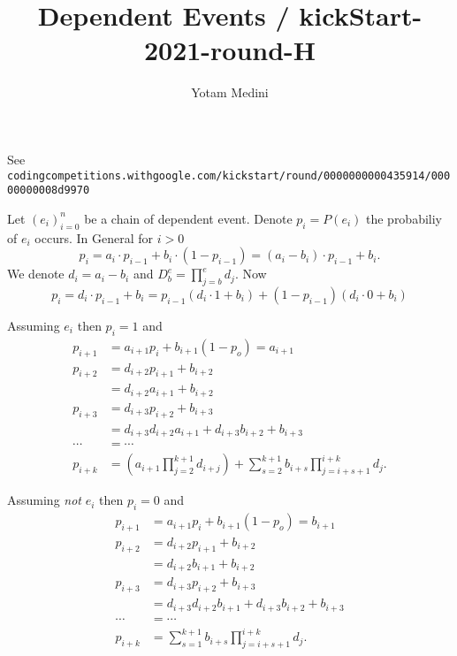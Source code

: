 \documentclass[10pt]{article}
\title{Dependent Events / kickStart-2021-round-H}
\author{Yotam Medini}
\begin{document}
\maketitle

See \texttt{codingcompetitions.withgoogle.com/kickstart/round/0000000000435914/00000000008d9970}

Let \((e_i)_{i=0}^n\) be a chain of dependent event.
Denote \(p_i = P(e_i)\) the probabiliy of \(e_i\) occurs.
In General for \(i > 0\)
\begin{equation*}
p_i 
  = a_i\cdot p_{i-1} + b_i\cdot (1 - p_{i-1})
  = (a_i - b_i)\cdot p_{i-1} + b_i.
\end{equation*}
We denote \(d_i = a_i - b_i\) and  \(D_b^e = \prod_{j=b}^e d_j\).
Now
\begin{equation*}
p_i = d_i\cdot p_{i-1} + b_i %
= p_{i-1}(d_i\cdot 1 + b_i) + (1 - p_{i-1})(d_i\cdot 0 + b_i)
\end{equation*}

Assuming \(e_i\) then \(p_i = 1\) and
\begin{align*}
p_{i+1} &= a_{i+1} p_i + b_{i+1}(1 - p_o) = a_{i+1} \\
p_{i+2} &= d_{i+2}p_{i+1} + b_{i+2} \\
       &= d_{i+2}a_{i+1} + b_{i+2} \\
p_{i+3} &= d_{i+3}p_{i+2} + b_{i+3} \\
       &= d_{i+3}d_{i+2}a_{i+1} + d_{i+3}b_{i+2} + b_{i+3} \\
\cdots &= \cdots \\
p_{i+k} &= \left(a_{i+1}\prod_{j=2}^{k+1}d_{i+j}\right)
       +  \sum_{s=2}^{k+1} b_{i+s} \prod_{j=i+s+1}^{i+k} d_j .
\end{align*}


Assuming \emph{not} \(e_i\) then \(p_i = 0\) and
\begin{align*}
p_{i+1} &= a_{i+1} p_i + b_{i+1}(1 - p_o) = b_{i+1} \\
p_{i+2} &= d_{i+2}p_{i+1} + b_{i+2} \\
       &= d_{i+2}b_{i+1} + b_{i+2} \\
p_{i+3} &= d_{i+3}p_{i+2} + b_{i+3} \\
       &= d_{i+3}d_{i+2}b_{i+1} + d_{i+3}b_{i+2} + b_{i+3} \\
\cdots &= \cdots \\
p_{i+k} &= \sum_{s=1}^{k+1} b_{i+s} \prod_{j=i+s+1}^{i+k} d_j .
\end{align*}
\end{document}
